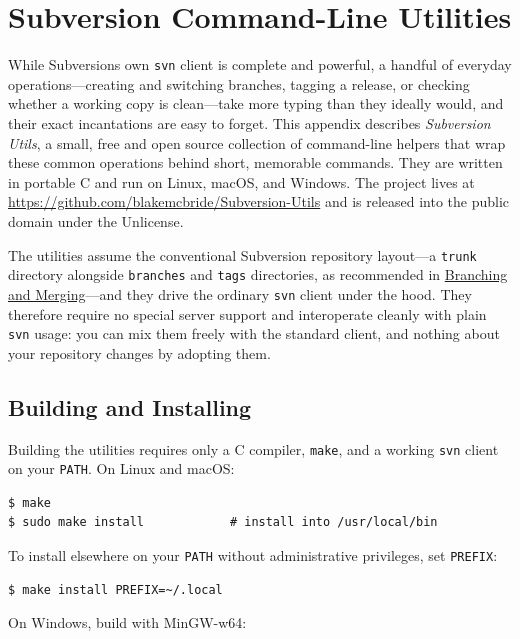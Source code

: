 \chapter{Subversion Command-Line Utilities}\label{svn.utils}

While Subversion\textquotesingle s own \texttt{svn} client is complete and
powerful, a handful of everyday operations---creating and switching
branches, tagging a release, or checking whether a working copy is
clean---take more typing than they ideally would, and their exact
incantations are easy to forget. This appendix describes \emph{Subversion
Utils}, a small, free and open source collection of command-line helpers
that wrap these common operations behind short, memorable commands. They
are written in portable C and run on Linux, macOS, and Windows. The
project lives at
\url{https://github.com/blakemcbride/Subversion-Utils} and is released
into the public domain under the Unlicense.

The utilities assume the conventional Subversion repository
layout---a \texttt{trunk} directory alongside \texttt{branches} and
\texttt{tags} directories, as recommended in
\hyperref[svn.branchmerge]{Branching and Merging}---and they drive the
ordinary \texttt{svn} client under the hood. They therefore require no
special server support and interoperate cleanly with plain \texttt{svn}
usage: you can mix them freely with the standard client, and nothing about
your repository changes by adopting them.

\section{Building and Installing}\label{svn.utils.install}

Building the utilities requires only a C compiler, \texttt{make}, and a
working \texttt{svn} client on your \texttt{PATH}. On Linux and macOS:

\begin{verbatim}
$ make
$ sudo make install            # install into /usr/local/bin
\end{verbatim}

To install elsewhere on your \texttt{PATH} without administrative
privileges, set \texttt{PREFIX}:

\begin{verbatim}
$ make install PREFIX=~/.local
\end{verbatim}

On Windows, build with MinGW-w64:

